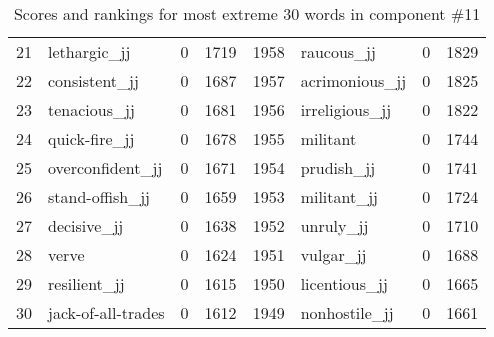 \begin{table}[tbp]
\begin{tabular}{| rlr@{.}l | rlr@{.}l |}
    21 & lethargic\_jj & 0 & 1719    &    1958 & raucous\_jj & 0 & 1829 \\
    22 & consistent\_jj & 0 & 1687    &    1957 & acrimonious\_jj & 0 & 1825 \\
    23 & tenacious\_jj & 0 & 1681    &    1956 & irreligious\_jj & 0 & 1822 \\
    24 & quick-fire\_jj & 0 & 1678    &    1955 & militant & 0 & 1744 \\
    25 & overconfident\_jj & 0 & 1671    &    1954 & prudish\_jj & 0 & 1741 \\
    26 & stand-offish\_jj & 0 & 1659    &    1953 & militant\_jj & 0 & 1724 \\
    27 & decisive\_jj & 0 & 1638    &    1952 & unruly\_jj & 0 & 1710 \\
    28 & verve & 0 & 1624    &    1951 & vulgar\_jj & 0 & 1688 \\
    29 & resilient\_jj & 0 & 1615    &    1950 & licentious\_jj & 0 & 1665 \\
    30 & jack-of-all-trades & 0 & 1612    &    1949 & nonhostile\_jj & 0 & 1661 \\
    \hline
    \end{tabular}
    \caption{Scores and rankings for most extreme 30 words in component \#11} 
\end{table}
\clearpage
